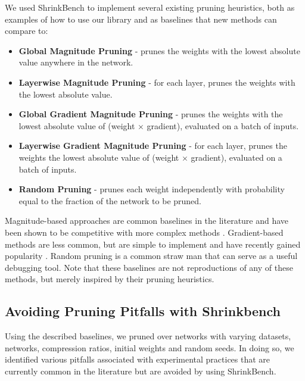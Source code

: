 We used ShrinkBench to implement several existing pruning heuristics, both as examples of how to use our library and as baselines that new methods can compare to:
\begin{itemize}[leftmargin=4mm]
    \itemsep-1pt
    \vspace{-2mm}
    \item \textbf{Global Magnitude Pruning} - prunes the weights with the lowest absolute value anywhere in the network.
    \item \textbf{Layerwise Magnitude Pruning} - for each layer, prunes the weights with the lowest absolute value.
    \item \textbf{Global Gradient Magnitude Pruning} - prunes the weights with the lowest absolute value of (weight $\times$ gradient), evaluated on a batch of inputs.
    \item \textbf{Layerwise Gradient Magnitude Pruning} - for each layer, prunes the weights the lowest absolute value of (weight $\times$ gradient), evaluated on a batch of inputs.
    \item \textbf{Random Pruning} - prunes each weight independently with probability equal to the fraction of the network to be pruned.
\end{itemize}
\vspace{-2mm}

Magnitude-based approaches are common baselines in the literature and have been shown to be competitive with more complex methods \cite{learning-both, han-prune-quant-huff, google-state-of-sparsity, lottery-ticket-followup}. Gradient-based methods are less common, but are simple to implement and have recently gained popularity \cite{snip, snip-followup, nisp}. Random pruning is a common straw man that can serve as a useful debugging tool. Note that these baselines are not reproductions of any of these methods, but merely inspired by their pruning heuristics.

\subsection{Avoiding Pruning Pitfalls with Shrinkbench}

Using the described baselines, we pruned over \NEXP{} networks with varying datasets, networks, compression ratios, initial weights and random seeds.
%
In doing so, we identified various pitfalls associated with experimental practices that are currently common in the literature but are avoided by using ShrinkBench.

